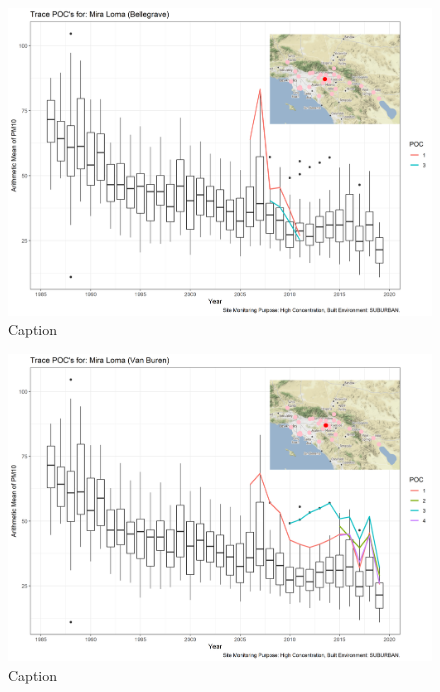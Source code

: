 \begin{figure}
    \centering
    \includegraphics[width = \textwidth]{Figures/IndividualSiteTraces/TracePOC_Mira Loma (Bellegrave).png}
    \caption{Caption}
    \label{fig:my_label}
\end{figure}

\begin{figure}
    \centering
    \includegraphics[width = \textwidth]{Figures/IndividualSiteTraces/TracePOC_Mira Loma (Van Buren).png}
    \caption{Caption}
    \label{fig:my_label}
\end{figure}

